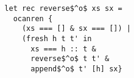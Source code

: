 \begin{lstlisting}
  let rec reverse$^o$ xs sx =
    ocanren {
      (xs === [] & sx === []) |
      (fresh h t t' in
        xs === h :: t &
        reverse$^o$ t t' &
        append$^o$ t' [h] sx}
  \end{lstlisting}